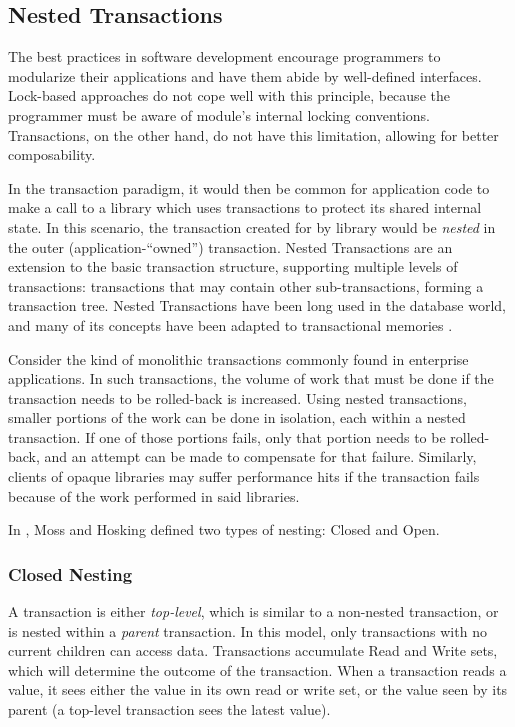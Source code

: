 \documentclass{llncs}
\begin{document}
\subsection{Nested Transactions}

The best practices in software development encourage programmers to
modularize their applications and have them abide by well-defined
interfaces. Lock-based approaches do not cope well with this
principle, because the programmer must be aware of module's internal
locking conventions. Transactions, on the other hand, do not have this
limitation, allowing for better composability.

In the transaction paradigm, it would then be common for application
code to make a call to a library which uses transactions to protect
its shared internal state. In this scenario, the transaction created
for by library would be {\it nested} in the outer
(application-``owned'') transaction. Nested Transactions are an
extension to the basic transaction structure, supporting multiple
levels of transactions: transactions that may contain other
sub-transactions, forming a transaction tree. Nested Transactions have
been long used in the database world, and many of its concepts have
been adapted to transactional memories \cite{worah1997transactions}.

Consider the kind of monolithic transactions commonly found in
enterprise applications. In such transactions, the volume of work that
must be done if the transaction needs to be rolled-back is
increased. Using nested transactions, smaller portions of the work can
be done in isolation, each within a nested transaction. If one of
those portions fails, only that portion needs to be rolled-back, and
an attempt can be made to compensate for that failure. Similarly,
clients of opaque libraries may suffer performance hits if the
transaction fails because of the work performed in said libraries.

In \cite{moss2006nested}, Moss and Hosking defined two types of
nesting: Closed and Open.

\subsubsection{Closed Nesting}

A transaction is either {\it top-level}, which is similar to a
non-nested transaction, or is nested within a {\it parent}
transaction. In this model, only transactions with no current children
can access data. Transactions accumulate Read and Write sets, which
will determine the outcome of the transaction. When a transaction
reads a value, it sees either the value in its own read or write set,
or the value seen by its parent (a top-level transaction sees the
latest value).
\end{document}
